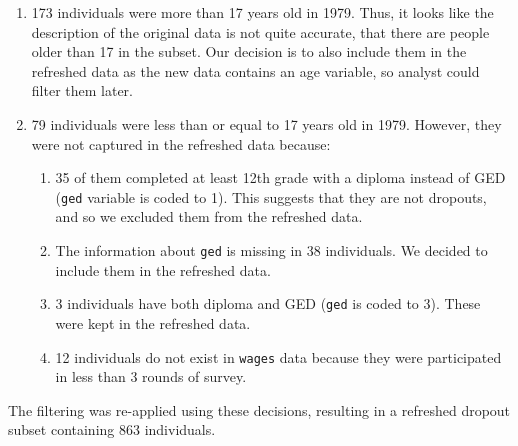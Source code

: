 \documentclass{article}
\providecommand{\tightlist}{%
  \setlength{\itemsep}{0pt}\setlength{\parskip}{0pt}}
\begin{document}
\begin{enumerate}
\def\labelenumi{\arabic{enumi}.}
\tightlist
\item
  173 individuals were more than 17 years old in 1979. Thus, it looks like the description of the original data is not quite accurate, that there are people older than 17 in the subset. Our decision is to also include them in the refreshed data as the new data contains an age variable, so analyst could filter them later.
\item
  79 individuals were less than or equal to 17 years old in 1979. However, they were not captured in the refreshed data because:

  \begin{enumerate}
  \def\labelenumii{\roman{enumii}.}
  \tightlist
  \item
    35 of them completed at least 12th grade with a diploma instead of GED (\texttt{ged} variable is coded to 1). This suggests that they are not dropouts, and so we excluded them from the refreshed data.
  \item
    The information about \texttt{ged} is missing in 38 individuals. We decided to include them in the refreshed data.
  \item
    3 individuals have both diploma and GED (\texttt{ged} is coded to 3). These were kept in the refreshed data.
  \item
    12 individuals do not exist in \texttt{wages} data because they were participated in less than 3 rounds of survey.
  \end{enumerate}
\end{enumerate}

The filtering was re-applied using these decisions, resulting in a refreshed dropout subset containing 863 individuals.
\end{document}
